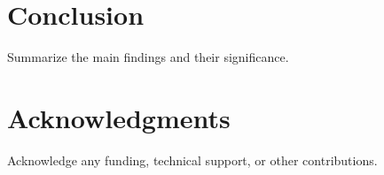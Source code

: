 \section{Conclusion}
\label{sec:conclusion}
Summarize the main findings and their significance.

\section*{Acknowledgments}
Acknowledge any funding, technical support, or other contributions. 